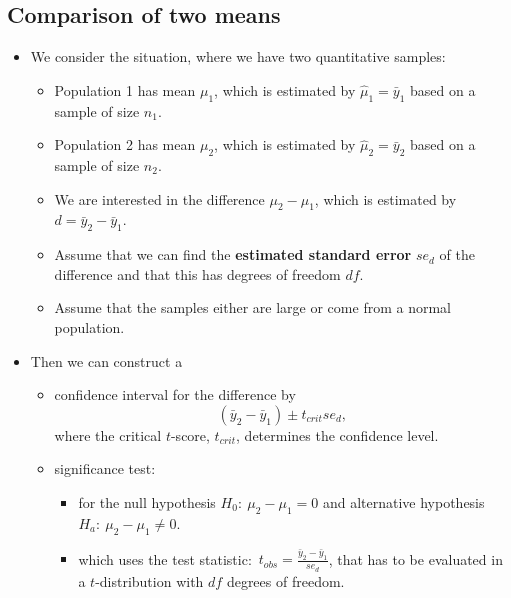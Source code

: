 \documentclass[]{article}
\providecommand{\tightlist}{%
  \setlength{\itemsep}{0pt}\setlength{\parskip}{0pt}}
\begin{document}
\subsection{Comparison of two means}\label{comparison-of-two-means}

\begin{itemize}
\tightlist
\item
  We consider the situation, where we have two quantitative samples:

  \begin{itemize}
  \tightlist
  \item
    Population 1 has mean \(\mu_1\), which is estimated by
    \(\hat{\mu}_1=\bar{y}_1\) based on a sample of size \(n_1\).
  \item
    Population 2 has mean \(\mu_2\), which is estimated by
    \(\hat{\mu}_2=\bar{y}_2\) based on a sample of size \(n_2\).
  \item
    We are interested in the difference \(\mu_2-\mu_1\), which is
    estimated by \(d=\bar{y}_2-\bar{y}_1\).
  \item
    Assume that we can find the \textbf{estimated standard error}
    \(se_d\) of the difference and that this has degrees of freedom
    \(df\).
  \item
    Assume that the samples either are large or come from a normal
    population.
  \end{itemize}
\item
  Then we can construct a

  \begin{itemize}
  \tightlist
  \item
    confidence interval for the difference by \[
      (\bar{y}_2-\bar{y}_1)\pm t_{crit}se_d,
      \] where the critical \(t\)-score, \(t_{crit}\), determines the
    confidence level.
  \item
    significance test:

    \begin{itemize}
    \tightlist
    \item
      for the null hypothesis \(H_0:\ \mu_2-\mu_1=0\) and alternative
      hypothesis \(H_a:\ \mu_2-\mu_1\neq 0\).
    \item
      which uses the test
      statistic:~\(t_{obs} = \frac{\bar{y}_2-\bar{y}_1}{se_d}\), that
      has to be evaluated in a \(t\)-distribution with \(df\) degrees of
      freedom.
    \end{itemize}
  \end{itemize}
\end{itemize}
\end{document}
